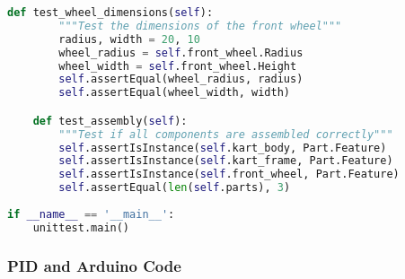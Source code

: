 \documentclass[a4paper,12pt]{article}
\begin{document}
\begin{lstlisting}[language=Python]
    def test_wheel_dimensions(self):
        """Test the dimensions of the front wheel"""
        radius, width = 20, 10
        wheel_radius = self.front_wheel.Radius
        wheel_width = self.front_wheel.Height
        self.assertEqual(wheel_radius, radius)
        self.assertEqual(wheel_width, width)

    def test_assembly(self):
        """Test if all components are assembled correctly"""
        self.assertIsInstance(self.kart_body, Part.Feature)
        self.assertIsInstance(self.kart_frame, Part.Feature)
        self.assertIsInstance(self.front_wheel, Part.Feature)
        self.assertEqual(len(self.parts), 3)  
        
if __name__ == '__main__':
    unittest.main()
\end{lstlisting}
\subsubsection{PID and Arduino Code}
\end{document}
